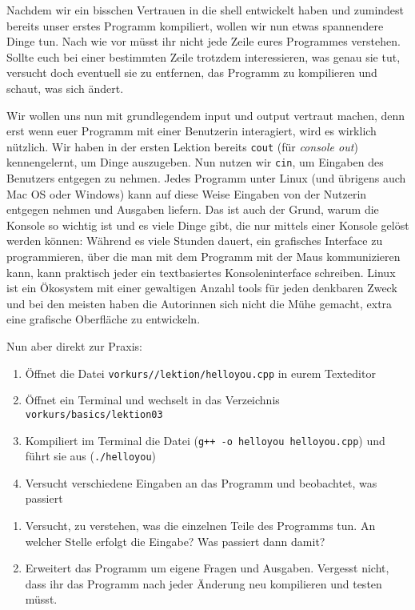 
Nachdem wir ein bisschen Vertrauen in die shell entwickelt haben und zumindest
bereits unser erstes Programm kompiliert, wollen wir nun etwas spannendere
Dinge tun. Nach wie vor müsst ihr nicht jede Zeile eures Programmes verstehen.
Sollte euch bei einer bestimmten Zeile trotzdem interessieren, was genau sie
tut, versucht doch eventuell sie zu entfernen, das Programm zu kompilieren und
schaut, was sich ändert.

Wir wollen uns nun mit grundlegendem input und output vertraut machen, denn
erst wenn euer Programm mit einer Benutzerin interagiert, wird es wirklich
nützlich. Wir haben in der ersten Lektion bereits \texttt{cout} (für
\emph{console out}) kennengelernt, um Dinge auszugeben. Nun nutzen wir
\texttt{cin}, um Eingaben des Benutzers entgegen zu nehmen. Jedes Programm
unter Linux (und übrigens auch Mac OS oder Windows) kann auf diese Weise
Eingaben von der Nutzerin entgegen nehmen und Ausgaben liefern. Das ist auch
der Grund, warum die Konsole so wichtig ist und es viele Dinge gibt, die nur
mittels einer Konsole gelöst werden können: Während es viele Stunden dauert,
ein grafisches Interface zu programmieren, über die man mit dem Programm mit
der Maus kommunizieren kann, kann praktisch jeder ein textbasiertes
Konsoleninterface schreiben. Linux ist ein Ökosystem mit einer gewaltigen
Anzahl tools für jeden denkbaren Zweck und bei den meisten haben die Autorinnen
sich nicht die Mühe gemacht, extra eine grafische Oberfläche zu entwickeln.

Nun aber direkt zur Praxis:

\begin{praxis}
    \begin{enumerate}
        \item Öffnet die Datei \texttt{vorkurs/\dirname/lektion/helloyou.cpp} in eurem Texteditor
        \item Öffnet ein Terminal und wechselt in das Verzeichnis \texttt{vorkurs/basics/lektion03}
        \item Kompiliert im Terminal die Datei (\texttt{g++ -o helloyou
                  helloyou.cpp}) und führt sie aus (\texttt{./helloyou})
        \item Versucht verschiedene Eingaben an das Programm und beobachtet, was passiert
    \end{enumerate}

\end{praxis}

\begin{spiel}
    \begin{enumerate}
        \item Versucht, zu verstehen, was die einzelnen Teile des Programms tun. An
              welcher Stelle erfolgt die Eingabe? Was passiert dann damit?
        \item Erweitert das Programm um eigene Fragen und Ausgaben. Vergesst nicht,
              dass ihr das Programm nach jeder Änderung neu kompilieren und testen
              müsst.
    \end{enumerate}
\end{spiel}
